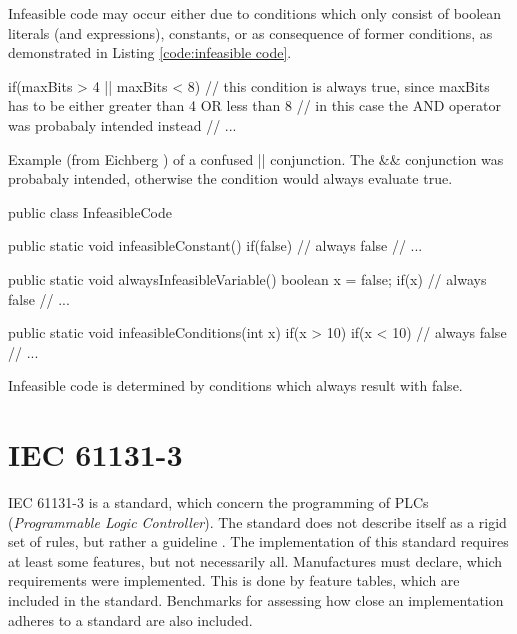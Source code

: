 Infeasible code may occur either due to conditions which only consist of boolean literals (and expressions), constants, or as consequence of former conditions, as demonstrated in Listing \ref{code:infeasible code}.

\begin{program}[h!]
	\begin{JavaCode}
if(maxBits > 4 || maxBits < 8) {
	// this condition is always true, since maxBits has to be either greater than 4 OR less than 8
	// in this case the AND operator was probabaly intended instead 
	// ...
}
	\end{JavaCode}
	\caption{Example (from Eichberg \cite{Eichberg_2015}) of a confused || conjunction. The \&\& conjunction was probabaly intended, otherwise the condition would always evaluate true.}
	\label{fig:operator confusion}
\end{program}

\begin{program}[h!]
	\begin{JavaCode}
		public class InfeasibleCode {
			public static void infeasibleConstant() {
				if(false) {
					// always false
					// ...
				}
			}
			
			public static void alwaysInfeasibleVariable() {
				boolean x = false;
				if(x) {
					// always false
					// ...
				}
			}
			
			public static void infeasibleConditions(int x) {
				if(x > 10) {
					if(x < 10) {
						// always false
						// ...
					}
				}
			}
	}\end{JavaCode}
	\caption{Infeasible code is determined by conditions which always result with false. }
	\label{code:infeasible code}
\end{program}

\section{IEC 61131-3}
\label{sec:iec}

IEC 61131-3 is a standard, which concern the programming of PLCs (\emph{Programmable Logic Controller}). The standard does not describe itself as a rigid set of rules, but rather a guideline \cite{johnIEC611313Programming2010}. The implementation of this standard requires at least some features, but not necessarily all. Manufactures must declare, which requirements were implemented. This is done by feature tables, which are included in the standard. Benchmarks for assessing how close an implementation adheres to a standard are also included.


